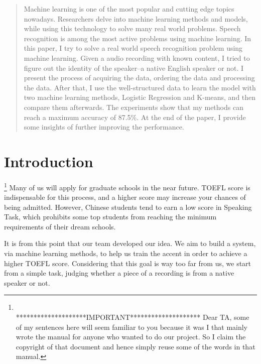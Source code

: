 \documentclass{sig-alternate}
\begin{document}
\date{30 July 1999}


\maketitle
\begin{abstract}
Machine learning is one of the most popular and cutting edge topics nowadays. Researchers delve into machine learning methods and models, while using this technology to solve many real world problems. Speech recognition is among the most active problems using machine learning. In this paper, I try to solve a real world speech recognition problem using machine learning. Given a audio recording with known content, I tried to figure out the identity of the speaker--a native English speaker or not. I present the process of acquiring the data, ordering the data and processing the data. After that, I use the well-structured data to learn the model with two machine learning methods, Logistic Regression and K-means, and then compare them afterwards. The experiments show that my methods can reach a maximum accuracy of 87.5\%. At the end of the paper, I provide some insights of further improving the performance.
\end{abstract}




\section{Introduction}\footnote{\\ ********************IMPORTANT********************  Dear TA, some of my sentences here will seem familiar to you because it was I that mainly wrote the manual for anyone who wanted to do our project. So I claim the copyright of that document and hence simply reuse some of the words in that manual.}
Many of us will apply for graduate schools in the near future. TOEFL score is indispensable for this process, and a higher score may increase your chances of being admitted. However, Chinese students tend to earn a low score in Speaking Task, which prohibits some top students from reaching the minimum requirements of their dream schools.

It is from this point that our team developed our idea. We aim to build a system, via machine learning methods, to help us train the accent in order to achieve a higher TOEFL score. Considering that this goal is way too far from us, we start from a simple task, judging whether a piece of a recording is from a native speaker or not.
\end{document}
